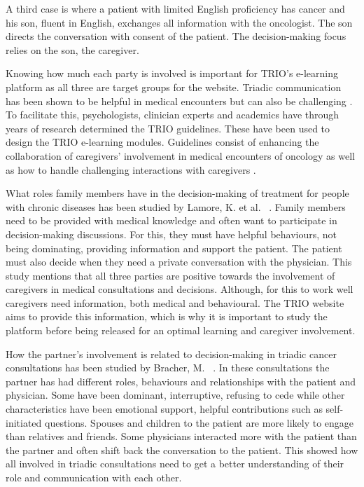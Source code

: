 \documentclass{sigchi}
\begin{document}

A third case is where a patient with limited English proficiency has cancer and his son, fluent in English, exchanges all information with the oncologist. The son directs the conversation with consent of the patient. The decision-making focus relies on the son, the caregiver.

Knowing how much each party is involved is important for TRIO’s e-learning platform as all three are target groups for the website. Triadic communication has been shown to be helpful in medical encounters but can also be challenging \cite{Laidsaar-Powell2013}. To facilitate this, psychologists, clinician experts and academics have through years of research determined the TRIO guidelines. These have been used to design the TRIO e-learning modules. Guidelines consist of enhancing the collaboration of caregivers' involvement in medical encounters of oncology as well as how to handle challenging interactions with caregivers \cite{Laidsaar-Powell2018a, Laidsaar-Powell2018}.

What roles family members have in the decision-making of treatment for people with chronic diseases has been studied by Lamore, K. et al. ~\cite{Lamore2017}. Family members need to be provided with medical knowledge and often want to participate in decision-making discussions. For this, they must have helpful behaviours, not being dominating, providing information and support the patient. The patient must also decide when they need a private conversation with the physician. This study mentions that all three parties are positive towards the involvement of caregivers in medical consultations and decisions. Although, for this to work well caregivers need information, both medical and behavioural. The TRIO website aims to provide this information, which is why it is important to study the platform before being released for an optimal learning and caregiver involvement. 

How the partner’s involvement is related to decision-making in triadic cancer consultations has been studied by Bracher, M. ~\cite{Bracher2019}. In these consultations the partner has had different roles, behaviours and relationships with the patient and physician. Some have been dominant, interruptive, refusing to cede while other characteristics have been emotional support, helpful contributions such as self-initiated questions. Spouses and children to the patient are more likely to engage than relatives and friends. Some physicians interacted more with the patient than the partner and often shift back the conversation to the patient. This showed how all involved in triadic consultations need to get a better understanding of their role and communication with each other.
\end{document}
